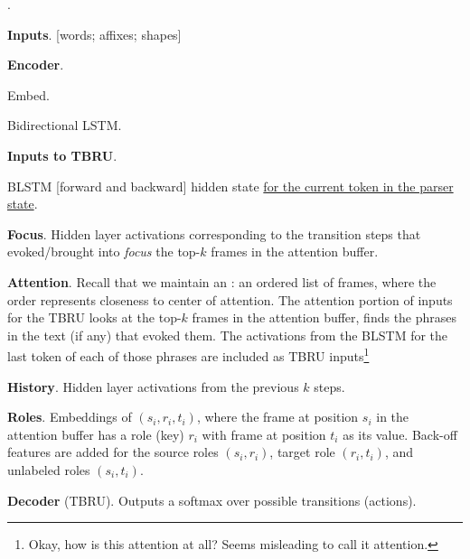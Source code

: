 \documentclass[11pt]{article}
\begin{document}
\p {}. 
\begin{compactitem}
	\item \textbf{Inputs}. [words; affixes; shapes]
	
	\item \textbf{Encoder}. 
	\begin{compactenum}
		\item Embed.
		\item Bidirectional LSTM. 
	\end{compactenum}
	
	\item \textbf{Inputs to TBRU}.
	\begin{compactitem}
		\item BLSTM [forward and backward] hidden state \underline{for the current token in the parser state}.
		
		\item \textbf{Focus}. Hidden layer activations corresponding to the transition steps that evoked/brought into \textit{focus} the top-$k$ frames in the attention buffer.
		
		\item \textbf{Attention}. Recall that we maintain an : an ordered list of frames, where the order represents closeness to center of attention. The attention portion of inputs for the TBRU looks at the top-$k$ frames in the attention buffer, finds the phrases in the text (if any) that evoked them. The activations from the BLSTM for the last token of each of those phrases are included as TBRU inputs\footnote{Okay, how is this attention at all? Seems misleading to call it attention.}
		
		\item \textbf{History}. Hidden layer activations from the previous $k$ steps.
		
		\item \textbf{Roles}. Embeddings of $(s_i, r_i, t_i)$, where the frame at position $s_i$ in the attention buffer has a role (key) $r_i$ with frame at position $t_i$ as its value. Back-off features are added for the source roles $(s_i, r_i)$, target role $(r_i, t_i)$, and unlabeled roles $(s_i, t_i)$. 
	\end{compactitem}
	
	\item \textbf{Decoder} (TBRU). Outputs a softmax over possible transitions (actions). 
\end{compactitem}
\end{document}
